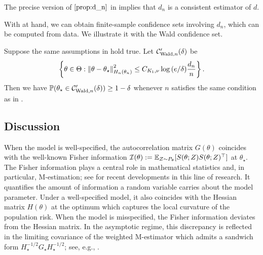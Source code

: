 The precise version of $\Cref{prop:d_n}$ in  implies that $d_n$ is a consistent estimator of $d$.

With  at hand, we can obtain finite-sample confidence sets involving $d_n$, which can be computed from data.
We illustrate it with the Wald confidence set.
\begin{corollary}\label{cor:wald_conf_set}
    Suppose the same assumptions in  hold true.
    Let $\mathcal{C}_{\text{Wald}, n}'(\delta)$ be
    \begin{align*}
        \left\{ \theta \in \Theta: \left\lVert \theta - \theta_\star \right\rVert_{H_n(\theta_n)}^2 \le C_{K_1, \nu} \log{(e/\delta)} \frac{d_n}{n} \right\}.
    \end{align*}
    Then we have $\operatorname{\mathbb P}(\theta_\star \in \mathcal{C}_{\text{Wald}, n}'(\delta)) \ge 1 - \delta$ whenever $n$ satisfies the same condition as in .
\end{corollary}

\subsection{Discussion}
\label{sub:discussion}

When the model is well-specified, the autocorrelation matrix $G(\theta)$ coincides with the well-known Fisher information $\mathcal{I}(\theta) := \operatorname{\mathbb E}_{Z \sim P_\theta}[S(\theta; Z)S(\theta; Z)^\top]$ at $\theta_\star$.
The Fisher information plays a central role in mathematical statistics and, in particular, M-estimation; see \citep{pennington2018spectrum,kunstner2019limitations,ash2021gone,soen2021variance} for recent developments in this line of research.
It quantifies the amount of information a random variable carries about the model parameter.
Under a well-specified model, it also coincides with the Hessian matrix $H(\theta)$ at the optimum which captures the local curvature of the population risk.
When the model is misspecified, the Fisher information deviates from the Hessian matrix.
In the asymptotic regime, this discrepancy is reflected in the limiting covariance of the weighted M-estimator which admits a sandwich form $H_\star^{-1/2} G_\star H_\star^{-1/2}$; see, e.g., \cite[Sec.~4]{huber1967under}.

